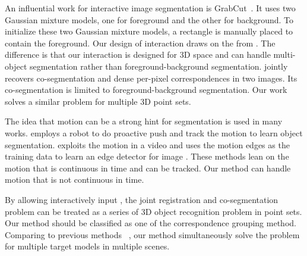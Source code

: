 %
An influential work for interactive image segmentation is GrabCut~\cite{grabcut}. It uses two Gaussian mixture models, one for foreground and the other for background. 
To initialize these two Gaussian mixture models, a rectangle is manually placed to contain the foreground. 
Our design of interaction draws on the  from \cite{grabcut}. 
%
The difference is that our interaction is designed for 3D space and can handle multi-object segmentation rather than foreground-background segmentation. 
%
\cite{Taniai_2016_CVPR} jointly recovers co-segmentation and dense per-pixel correspondences in two images. 
Its co-segmentation is limited to foreground-background segmentation. Our work solves a similar problem for multiple 3D point sets. 

The idea that motion can be a strong hint for segmentation is used in many works.
\cite{Xu:2015:ACS:2816795.2818075} employs a robot to do proactive push and track the motion to learn object segmentation. 
\cite{unsupervisededge} exploits the motion in a video and uses the motion edges as the training data to learn an edge detector for image . 
These methods lean on the motion that is continuous in time and can be tracked. Our method can handle motion that is not continuous in time.

By allowing interactively input , the joint registration and co-segmentation problem can be treated as a series of 3D object recognition problem in point sets. Our method should be classified as one of the correspondence grouping method. Comparing to previous methods ~\cite{hough,LOF}, our method simultaneously solve the problem for multiple target models in multiple scenes.
